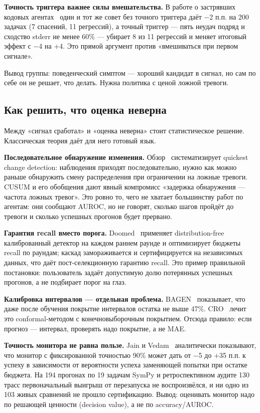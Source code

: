 \documentclass[11pt,a4paper]{article}
\begin{document}
\textbf{Точность триггера важнее силы вмешательства.}
В работе о застрявших кодовых агентах~\cite{silva2026trigger} один и тот же
совет без точного триггера даёт −2 п.п. на 200 задачах (7 спасений, 11
регрессий), а точный триггер — пять неудач подряд и сходство stderr не
менее 60\% — убирает 8 из 11 регрессий и меняет итоговый эффект с −4 на +4.
Это прямой аргумент против «вмешиваться при первом сигнале».

Вывод группы: поведенческий симптом — хороший кандидат в сигнал, но сам
по себе он не решает, что делать. Нужна политика с ценой ложной тревоги.

\subsection{Как решить, что оценка неверна}

Между «сигнал сработал» и «оценка неверна» стоит статистическое решение.
Классическая теория даёт для него готовый язык.

\textbf{Последовательное обнаружение изменения.}
Обзор~\cite{xie2021quickest} систематизирует quickest change detection:
наблюдения приходят последовательно, нужно как можно раньше обнаружить
смену распределения при ограничении на ложные тревоги. CUSUM и его
обобщения дают явный компромисс «задержка обнаружения — частота ложных
тревог». Это ровно то, чего не хватает большинству работ по агентам: они
сообщают AUROC, но не говорят, сколько шагов пройдёт до тревоги и сколько
успешных прогонов будет прервано.

\textbf{Гарантия recall вместо порога.}
Doomed~\cite{ruan2026doomed} применяет distribution-free калиброванный
детектор на каждом раннем раунде и оптимизирует бюджеты recall по раундам;
каскад замораживается и сертифицируется на независимых данных, что даёт
пост-селекционную гарантию recall. Это пример правильной постановки:
пользователь задаёт допустимую долю потерянных успешных прогонов, а не
подбирает порог на глаз.

\textbf{Калибровка интервалов — отдельная проблема.}
BAGEN~\cite{lin2026bagen} показывает, что даже после обучения покрытие
интервалов остатка не выше 47\%. CRO~\cite{shokrnezhad2026cro} лечит это
conformal-методом с конечновыборочным покрытием. Отсюда правило: если
прогноз — интервал, проверять надо покрытие, а не MAE.

\textbf{Точность монитора не равна пользе.}
Jain и Vedam~\cite{jain2026monitor} аналитически показывают, что монитор с
фиксированной точностью 90\% может дать от −5 до +35 п.п. к успеху в
зависимости от вероятности успеха заменяющей попытки при остатке бюджета.
На 194 прогонах по 19 задачам SymPy и ретроспективном аудите 130 трасс
первоначальный выигрыш от перезапуска не воспроизвёлся, и ни одно из 103
живых сравнений не прошло сертификацию. Вывод: оценивать монитор надо по
решающей ценности (decision value), а не по accuracy/AUROC.
\end{document}
